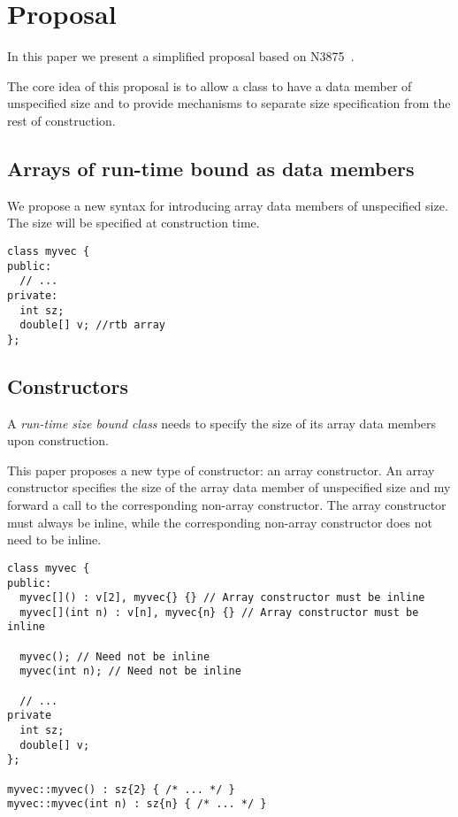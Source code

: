 \section{Proposal}

In this paper we present a simplified proposal based on N3875~\cite{n3875}.

The core idea of this proposal is to allow a class to have a data member of
unspecified size and to provide mechanisms to separate size specification
from the rest of construction.

\subsection{Arrays of run-time bound as data members}

We propose a new syntax for introducing array data members of unspecified size.
The size will be specified at construction time.

\begin{lstlisting}
class myvec {
public:
  // ...
private:
  int sz;
  double[] v; //rtb array
};
\end{lstlisting}

\subsection{Constructors}

A \emph{run-time size bound class} needs to specify the size of its array data
members upon construction.

This paper proposes a new type of constructor: an array constructor. An array
constructor specifies the size of the array data member of unspecified size and
my forward a call to the corresponding non-array constructor. The array
constructor must always be inline, while the corresponding non-array
constructor does not need to be inline.

\begin{lstlisting}
class myvec {
public:
  myvec[]() : v[2], myvec{} {} // Array constructor must be inline
  myvec[](int n) : v[n], myvec{n} {} // Array constructor must be inline

  myvec(); // Need not be inline
  myvec(int n); // Need not be inline

  // ...
private
  int sz;
  double[] v;
};

myvec::myvec() : sz{2} { /* ... */ }
myvec::myvec(int n) : sz{n} { /* ... */ }
\end{lstlisting}

